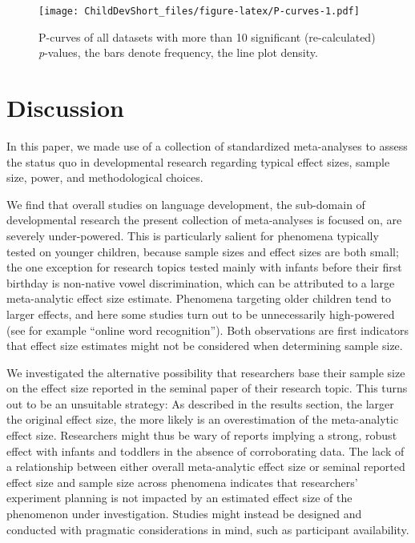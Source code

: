 \documentclass[english,floatsintext,man]{apa6}
\begin{document}
\begin{figure}[htbp]
\centering
\texttt{[image: ChildDevShort\_files/figure-latex/P-curves-1.pdf]}
\caption{P-curves of all datasets with more than 10 significant
(re-calculated) \emph{p}-values, the bars denote frequency, the line
plot density.}
\end{figure}

\section{Discussion}\label{discussion}

In this paper, we made use of a collection of standardized meta-analyses
to assess the status quo in developmental research regarding typical
effect sizes, sample size, power, and methodological choices.

We find that overall studies on language development, the sub-domain of
developmental research the present collection of meta-analyses is
focused on, are severely under-powered. This is particularly salient for
phenomena typically tested on younger children, because sample sizes and
effect sizes are both small; the one exception for research topics
tested mainly with infants before their first birthday is non-native
vowel discrimination, which can be attributed to a large meta-analytic
effect size estimate. Phenomena targeting older children tend to larger
effects, and here some studies turn out to be unnecessarily high-powered
(see for example \enquote{online word recognition}). Both observations
are first indicators that effect size estimates might not be considered
when determining sample size.

We investigated the alternative possibility that researchers base their
sample size on the effect size reported in the seminal paper of their
research topic. This turns out to be an unsuitable strategy: As
described in the results section, the larger the original effect size,
the more likely is an overestimation of the meta-analytic effect size.
Researchers might thus be wary of reports implying a strong, robust
effect with infants and toddlers in the absence of corroborating data.
The lack of a relationship between either overall meta-analytic effect
size or seminal reported effect size and sample size across phenomena
indicates that researchers' experiment planning is not impacted by an
estimated effect size of the phenomenon under investigation. Studies
might instead be designed and conducted with pragmatic considerations in
mind, such as participant availability.
\end{document}
